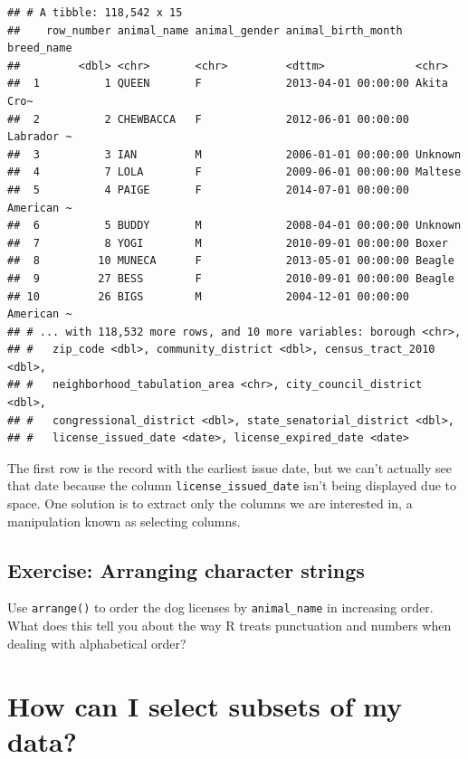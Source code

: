 \documentclass[]{Nemilov}
\begin{document}
\begin{verbatim}
## # A tibble: 118,542 x 15
##    row_number animal_name animal_gender animal_birth_month  breed_name
##         <dbl> <chr>       <chr>         <dttm>              <chr>     
##  1          1 QUEEN       F             2013-04-01 00:00:00 Akita Cro~
##  2          2 CHEWBACCA   F             2012-06-01 00:00:00 Labrador ~
##  3          3 IAN         M             2006-01-01 00:00:00 Unknown   
##  4          7 LOLA        F             2009-06-01 00:00:00 Maltese   
##  5          4 PAIGE       F             2014-07-01 00:00:00 American ~
##  6          5 BUDDY       M             2008-04-01 00:00:00 Unknown   
##  7          8 YOGI        M             2010-09-01 00:00:00 Boxer     
##  8         10 MUNECA      F             2013-05-01 00:00:00 Beagle    
##  9         27 BESS        F             2010-09-01 00:00:00 Beagle    
## 10         26 BIGS        M             2004-12-01 00:00:00 American ~
## # ... with 118,532 more rows, and 10 more variables: borough <chr>,
## #   zip_code <dbl>, community_district <dbl>, census_tract_2010 <dbl>,
## #   neighborhood_tabulation_area <chr>, city_council_district <dbl>,
## #   congressional_district <dbl>, state_senatorial_district <dbl>,
## #   license_issued_date <date>, license_expired_date <date>
\end{verbatim}

The first row is the record with the earliest issue date, but we can't actually see that date because the column \texttt{license\_issued\_date} isn't being displayed due to space. One solution is to extract only the columns we are interested in, a manipulation known as selecting columns.

\hypertarget{exercise-arranging-character-strings}{%
\subsection{Exercise: Arranging character strings}\label{exercise-arranging-character-strings}}

Use \texttt{arrange()} to order the dog licenses by \texttt{animal\_name} in increasing order. What does this tell you about the way R treats punctuation and numbers when dealing with alphabetical order?

\hypertarget{how-can-i-select-subsets-of-my-data}{%
\section{How can I select subsets of my data?}\label{how-can-i-select-subsets-of-my-data}}
\end{document}
